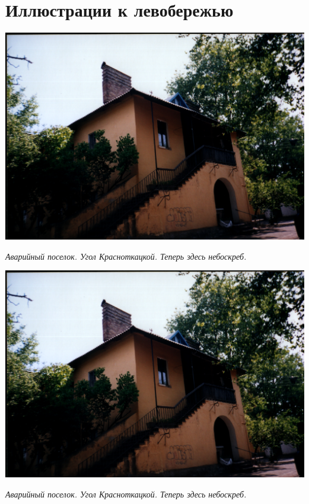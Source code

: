 \chapter*{Иллюстрации к левобережью}


\begin{center}
\includegraphics[width=\linewidth]{lpix/out0002.png}

\textit{Аварийный поселок. Угол Красноткацкой. Теперь здесь небоскреб.}
\end{center}

\newpage

\begin{center}
\includegraphics[width=\linewidth]{lpix/out0002.png}

\textit{Аварийный поселок. Угол Красноткацкой. Теперь здесь небоскреб.}
\end{center}

